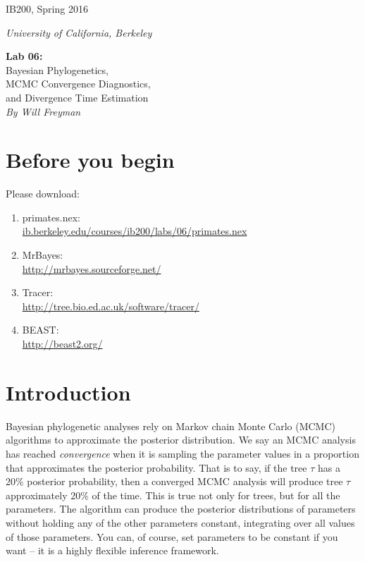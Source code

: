 \documentclass[11pt]{article}
\begin{document}
\noindent
\large
\begin{minipage}{0.5\textwidth}
\begin{flushleft} 
IB200, Spring 2016
\end{flushleft}
\end{minipage}
\begin{minipage}{0.5\textwidth}
\begin{flushright} 
\textit{University of California, Berkeley}
\end{flushright}
\end{minipage}

\vspace{0.5cm}


\begin{center}
\Large \textbf{Lab 06:} \\
Bayesian Phylogenetics, \\
MCMC Convergence Diagnostics, \\
and Divergence Time Estimation \\
\normalsize
\textit{By Will Freyman}
\end{center}

\vspace{0.5cm}

\section{Before you begin}

Please download:

\begin{enumerate}
  \item primates.nex: \\
        \url{ib.berkeley.edu/courses/ib200/labs/06/primates.nex}
  \item MrBayes: \\ 
        \url{http://mrbayes.sourceforge.net/}
  \item Tracer: \\
        \url{http://tree.bio.ed.ac.uk/software/tracer/}
  \item BEAST: \\ 
        \url{http://beast2.org/}
\end{enumerate}

\section{Introduction}

Bayesian phylogenetic analyses rely on Markov chain Monte Carlo (MCMC)
algorithms to approximate the posterior distribution. 
We say an MCMC analysis has reached \textit{convergence} 
when it is sampling the parameter values in a proportion that 
approximates the posterior probability. 
That is to say, if the tree $\tau$ has a 20\% posterior probability, 
then a converged MCMC analysis will produce tree $\tau$ approximately 
20\% of the time. 
This is true not only for trees, but for all the parameters. 
The algorithm can produce the posterior distributions of parameters
without holding any of the other parameters constant, 
integrating over all values of those parameters.
You can, of course, set parameters to be constant if you want -- 
it is a highly flexible inference framework.
\end{document}
